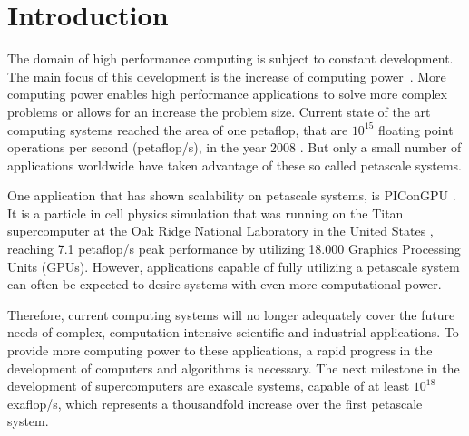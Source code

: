 \chapter{Introduction}
\label{sec:intro}



The domain of high performance computing is subject to constant
development.  The main focus of this development is the increase of
computing power~\cite{ref:performance_development}.  More computing power enables high performance
applications to solve more complex problems or allows for an increase the problem
size.  Current state of the art computing systems reached the area of
one petaflop, that are $10^{15}$ floating point operations per second
(petaflop/s), in the year 2008 \cite{ref:ibm_roadrunner}. But only a
small number of applications worldwide have taken advantage of these
so called petascale systems.

One application that has shown scalability on petascale systems, is
PIConGPU \cite{ref:picongpu_scale}. It is a particle in cell physics
simulation that was running on the Titan supercomputer at the Oak
Ridge National Laboratory in the United States \cite{ref:titan},
reaching 7.1 petaflop/s peak performance by utilizing 18.000 Graphics
Processing Units (GPUs). However, applications capable of fully
utilizing a petascale system can often be expected to desire systems
with even more computational power.

Therefore, current computing systems will no longer adequately cover
the future needs of complex, computation intensive scientific and
industrial applications.  To provide more computing power to these
applications, a rapid progress in the development of computers and
algorithms is necessary. The next milestone in the development of
supercomputers are exascale systems, capable of at least $10^{18}$
exaflop/s, which represents a thousandfold increase over the first
petascale system.

